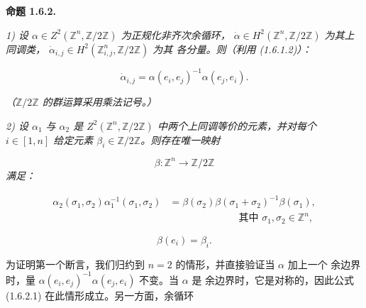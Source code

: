 \clearpage
{}%
\noindent\textbf{命题 1.6.2.}\quad

\noindent\emph{1) 设
$\alpha\in Z^2(\mathbb Z^n,\mathbb Z/2\mathbb Z)$ 为正规化非齐次余循环，
$\dot\alpha\in H^2(\mathbb Z^n,\mathbb Z/2\mathbb Z)$ 为其上同调类，
$\dot\alpha_{i,j}\in H^2(\mathbb Z^n_{i,j},\mathbb Z/2\mathbb Z)$ 为其
各分量。则（利用 (1.6.1.2)）：}

\begin{equation}
  \dot\alpha_{i,j}
  =\alpha(e_i,e_j)^{-1}\alpha(e_j,e_i).
  \tag{1.6.2.1}
\end{equation}

\noindent\emph{（$\mathbb Z/2\mathbb Z$ 的群运算采用乘法记号。）}

\noindent\emph{2) 设 $\alpha_1$ 与 $\alpha_2$ 是
$Z^2(\mathbb Z^n,\mathbb Z/2\mathbb Z)$ 中两个上同调等价的元素，并对每个
$i\in[1,n]$ 给定元素 $\beta_i\in\mathbb Z/2\mathbb Z$。则存在唯一映射}

\begin{equation*}
  \beta\colon\mathbb Z^n\longrightarrow\mathbb Z/2\mathbb Z
\end{equation*}
\noindent\emph{满足：}

\begin{equation}
  \begin{aligned}
    \alpha_2(\sigma_1,\sigma_2)\alpha_1^{-1}(\sigma_1,\sigma_2)
      &=\beta(\sigma_2)\beta(\sigma_1+\sigma_2)^{-1}\beta(\sigma_1),\\[-1mm]
    &\hspace{7em}\text{其中 }\sigma_1,\sigma_2\in\mathbb Z^n,
  \end{aligned}
  \tag{1.6.2.2}
\end{equation}

\begin{equation}
  \beta(e_i)=\beta_i.
  \tag{1.6.2.3}
\end{equation}

为证明第一个断言，我们归约到 $n=2$ 的情形，并直接验证当 $\alpha$ 加上一个
余边界时，量 $\alpha(e_i,e_j)^{-1}\alpha(e_j,e_i)$ 不变。当 $\alpha$ 是
余边界时，它是对称的，因此公式 (1.6.2.1) 在此情形成立。另一方面，余循环

